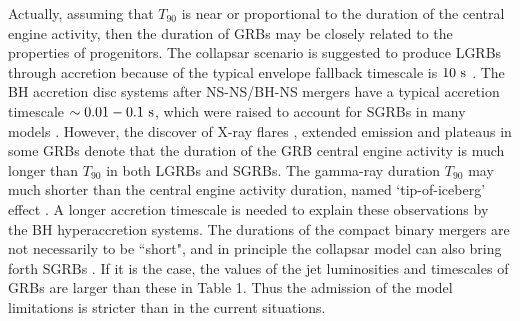 \documentclass[a4paper,fleqn,usenatbib]{mnras}
\begin{document}
Actually, assuming that $T_{90}$ is near or proportional to the duration of the central engine activity, then the duration of GRBs may be closely related to the properties of progenitors. The collapsar scenario is suggested to produce LGRBs through accretion because of the typical envelope fallback timescale is $10\rm~s$ \citep[e.g.,][]{MacFadyen1999}. The BH accretion disc systems after NS-NS/BH-NS mergers have a typical accretion timescale $\sim 0.01-0.1 \rm~s$, which were raised to account for SGRBs in many models \citep[e.g.,][]{Narayan2001,Aloy2005}. However, the discover of X-ray flares \citep[e.g.,][]{Burrows2005,Nousek2006,Wu2007,Chincarini2010,Margutti2010,Mu2016a,Mu2016b}, extended emission \citep[e.g.,][]{Lazzati2001,Connaughton2002,Norris2010,Norris2011,Liu2012b} and plateaus \citep[e.g.,][]{Troja2007,Rosswog2007,Rowlinson2013} in some GRBs denote that the duration of the GRB central engine activity is much longer than $T_{90}$ in both LGRBs and SGRBs. The gamma-ray duration $T_{90}$ may much shorter than the central engine activity duration, named `tip-of-iceberg' effect \citep{Lv2014,Zhang2014,Li2016,Gao2017a,Liu2018}. A longer accretion timescale is needed to explain these observations by the BH hyperaccretion systems. The durations of the compact binary mergers are not necessarily to be ``short", and in principle the collapsar model can also bring forth SGRBs \citep[e.g.,][]{Janiuk2008,Zhang2009}. If it is the case, the values of the jet luminosities and timescales of GRBs are larger than these in Table 1. Thus the admission of the model limitations is stricter than in the current situations.
\end{document}
